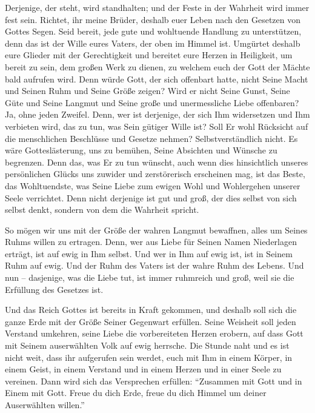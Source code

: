         
        Derjenige, der steht, wird standhalten; und der Feste in der Wahrheit wird immer fest sein. Richtet, ihr meine Brüder, deshalb euer Leben nach den Gesetzen von Gottes Segen. Seid bereit, jede gute und wohltuende Handlung zu unterstützen, denn das ist der Wille eures Vaters, der oben im Himmel ist. Umgürtet deshalb eure Glieder mit der Gerechtigkeit und bereitet eure Herzen in Heiligkeit, um bereit zu sein, dem großen Werk zu dienen, zu welchem euch der Gott der Mächte bald aufrufen wird. Denn würde Gott, der sich offenbart hatte, nicht Seine Macht und Seinen Ruhm und Seine Größe zeigen? Wird er nicht Seine Gunst, Seine Güte und Seine Langmut und Seine große und unermessliche Liebe offenbaren? Ja, ohne jeden Zweifel. Denn, wer ist derjenige, der sich Ihm widersetzen und Ihm verbieten wird, das zu tun, was Sein gütiger Wille ist? Soll Er wohl Rücksicht auf die menschlichen Beschlüsse und Gesetze nehmen? Selbstverständlich nicht. Es wäre Gotteslästerung, uns zu bemühen, Seine Absichten und Wünsche zu begrenzen. Denn das, was Er zu tun wünscht, auch wenn dies hinsichtlich unseres persönlichen Glücks uns zuwider und zerstörerisch erscheinen mag, ist das Beste, das Wohltuendste, was Seine Liebe zum ewigen Wohl und Wohlergehen unserer Seele verrichtet. Denn nicht derjenige ist gut und groß, der dies selbst von sich selbst denkt, sondern von dem die Wahrheit spricht. 
        
        So mögen wir uns mit der Größe der wahren Langmut bewaffnen, alles um Seines Ruhms willen zu ertragen. Denn, wer aus Liebe für Seinen Namen Niederlagen erträgt, ist auf ewig in Ihm selbst. Und wer in Ihm auf ewig ist, ist in Seinem Ruhm auf ewig. Und der Ruhm des Vaters ist der wahre Ruhm des Lebens. Und nun -- dasjenige, was die Liebe tut, ist immer ruhmreich und groß, weil sie die Erfüllung des Gesetzes ist. 
        
        Und das Reich Gottes ist bereits in Kraft gekommen, und deshalb soll sich die ganze Erde mit der Größe Seiner Gegenwart erfüllen. Seine Weisheit soll jeden Verstand umkehren, seine Liebe die vorbereiteten Herzen erobern, auf dass Gott mit Seinem auserwählten Volk auf ewig herrsche. Die Stunde naht und es ist nicht weit, dass ihr aufgerufen sein werdet, euch mit Ihm in einem Körper, in einem Geist, in einem Verstand und in einem Herzen und in einer Seele zu vereinen. Dann wird sich das Versprechen erfüllen: "`Zusammen mit Gott und in Einem mit Gott. Freue du dich Erde, freue du dich Himmel um deiner Auserwählten willen."' 
        
